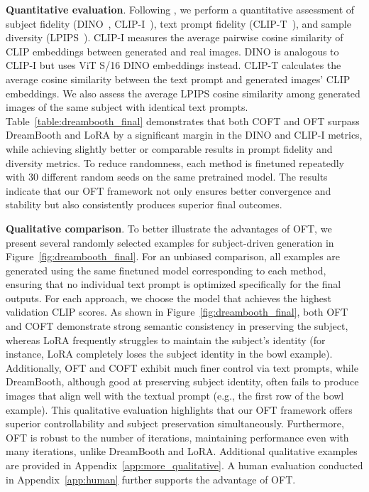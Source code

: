 \textbf{Quantitative evaluation}. Following \cite{ruiz2023dreambooth}, we perform a quantitative assessment of subject fidelity (DINO~\cite{caron2021emerging}, CLIP-I~\cite{radford2021learning}), text prompt fidelity (CLIP-T~\cite{radford2021learning}), and sample diversity (LPIPS~\cite{zhang2018unreasonable}). CLIP-I measures the average pairwise cosine similarity of CLIP embeddings between generated and real images. DINO is analogous to CLIP-I but uses ViT S/16 DINO embeddings instead. CLIP-T calculates the average cosine similarity between the text prompt and generated images' CLIP embeddings. We also assess the average LPIPS cosine similarity among generated images of the same subject with identical text prompts. Table~\ref{table:dreambooth_final} demonstrates that both COFT and OFT surpass DreamBooth and LoRA by a significant margin in the DINO and CLIP-I metrics, while achieving slightly better or comparable results in prompt fidelity and diversity metrics. To reduce randomness, each method is finetuned repeatedly with 30 different random seeds on the same pretrained model. The results indicate that our OFT framework not only ensures better convergence and stability but also consistently produces superior final outcomes.

\textbf{Qualitative comparison}. To better illustrate the advantages of OFT, we present several randomly selected examples for subject-driven generation in Figure~\ref{fig:dreambooth_final}. For an unbiased comparison, all examples are generated using the same finetuned model corresponding to each method, ensuring that no individual text prompt is optimized specifically for the final outputs. For each approach, we choose the model that achieves the highest validation CLIP scores. As shown in Figure~\ref{fig:dreambooth_final}, both OFT and COFT demonstrate strong semantic consistency in preserving the subject, whereas LoRA frequently struggles to maintain the subject’s identity (for instance, LoRA completely loses the subject identity in the bowl example). Additionally, OFT and COFT exhibit much finer control via text prompts, while DreamBooth, although good at preserving subject identity, often fails to produce images that align well with the textual prompt (e.g., the first row of the bowl example). This qualitative evaluation highlights that our OFT framework offers superior controllability and subject preservation simultaneously. Furthermore, OFT is robust to the number of iterations, maintaining performance even with many iterations, unlike DreamBooth and LoRA. Additional qualitative examples are provided in Appendix~\ref{app:more_qualitative}. A human evaluation conducted in Appendix~\ref{app:human} further supports the advantage of OFT.

